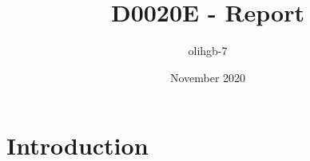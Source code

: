 \documentclass{article}
\title{D0020E - Report}
\author{olihgb-7 }
\date{November 2020}
\begin{document}
\maketitle

\newpage

\section{Introduction}
\end{document}
